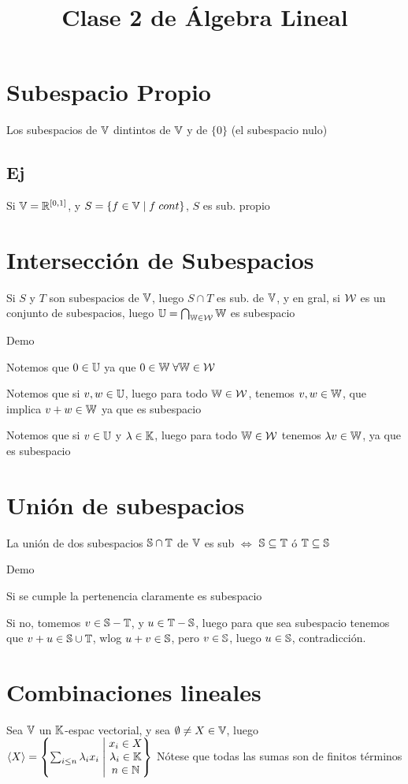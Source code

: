 \documentclass{article}
\title{Clase 2 de Álgebra Lineal}
\begin{document}
\maketitle
\section{Subespacio Propio}
Los subespacios de $\V$ dintintos de $\V$ y de $\{0\}$ (el subespacio nulo)
\subsection{Ej}
Si $\V = \R^{[0, 1]}$, y $S = \{f \in \V \mid f \; cont\}$, $S$ es sub. propio
\section{Intersección de Subespacios}
Si $S$ y $T$ son subespacios de $\V$, luego $S \cap T$ es sub. de $\V$, y en gral, si $\WW$
es un conjunto de subespacios, luego $\U = \bigcap_{\W \in \WW} \W$ es subespacio

Demo

Notemos que $0 \in \U$ ya que $0 \in \W \; \forall \W \in \WW$

Notemos que si $v, w \in \U$, luego para todo $\W \in \WW$, tenemos $v, w \in \W$, que
implica $v + w \in \W$ ya que es subespacio

Notemos que si $v \in \U$ y $\lambda \in \K$,
luego para todo $\W \in \WW$ tenemos $\lambda v \in \W$,
ya que es subespacio
\section{Unión de subespacios}
La unión de dos subespacios $\S \cap \T$ de $\V$ es sub
$\iff$ $\S \subseteq \T$ ó $\T \subseteq \S$

Demo

Si se cumple la pertenencia claramente es subespacio

Si no, tomemos $v \in \S - \T$, y $u \in \T - \S$, luego para que sea subespacio tenemos
que $v + u \in \S \cup \T$, wlog $u + v \in \S$,
pero $v \in \S$, luego $u \in \S$, contradicción.
\section{Combinaciones lineales}
Sea $\V$ un $\K$-espac vectorial, y sea $\emptyset \neq X \in \V$, luego
$\langle X \rangle = \left\{\sum_{i \leq n}\lambda_ix_i \;\middle|\;
\begin{matrix}
x_i \in X\\ \lambda_i \in \K\\ n \in \N
\end{matrix}
\right\}$
Nótese que todas las sumas son de finitos términos
\end{document}
